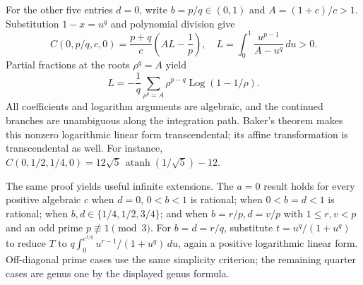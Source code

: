\documentclass[11pt,a4paper]{article}
\theoremstyle{definition}
\theoremstyle{remark}
\numberwithin{equation}{section}
\begin{document}
For the other five entries $d=0$, write $b=p/q\in(0,1)$ and
$A=(1+c)/c>1$. Substitution $1-x=u^q$ and polynomial division give
\[
 C(0,p/q,c,0)=\frac{p+q}{c}\left(AL-\frac1p\right),\quad
 L=\int_0^1\frac{u^{p-1}}{A-u^q}\,du>0.
\]
Partial fractions at the roots $\rho^q=A$ yield
\[
 L=-\frac1q\sum_{\rho^q=A}\rho^{p-q}
                 \operatorname{Log}(1-1/\rho).
\]
All coefficients and logarithm arguments are algebraic, and the
continued branches are unambiguous along the integration path.
Baker's theorem makes this nonzero logarithmic linear form
transcendental; its affine transformation is transcendental as well.
For instance,
$C(0,1/2,1/4,0)=12\sqrt5\,\operatorname{atanh}(1/\sqrt5)-12$.

The same proof yields useful infinite extensions. The $a=0$ result holds
for every positive algebraic $c$ when $d=0$, $0<b<1$ is rational; when
$0<b=d<1$ is rational; when $b,d\in\{1/4,1/2,3/4\}$; and when
$b=r/p,d=v/p$ with $1\le r,v<p$ and an odd prime
$p\not\equiv1\pmod3$. For $b=d=r/q$, substitute
$t=u^q/(1+u^q)$ to reduce $T$ to
$q\int_0^{c^{1/q}}u^{r-1}/(1+u^q)\,du$, again a positive logarithmic
linear form. Off-diagonal prime cases use the same simplicity criterion;
the remaining quarter cases are genus one by the displayed genus formula.
\end{document}
